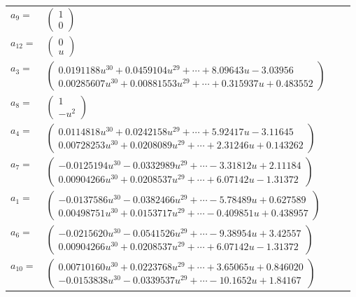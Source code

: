 \documentclass[1p]{elsarticle_modified}
\theoremstyle{definition}
\begin{document}
\begin{tabular}{m{7pt} m{180pt} m{7pt} m{180pt} }
\flushright $a_{9}=$&$\begin{pmatrix}1\\0\end{pmatrix}$ \\
\flushright $a_{12}=$&$\begin{pmatrix}0\\u\end{pmatrix}$ \\
\flushright $a_{3}=$&$\begin{pmatrix}0.0191188 u^{30}+0.0459104 u^{29}+\cdots+8.09643 u-3.03956\\0.00285607 u^{30}+0.00881553 u^{29}+\cdots+0.315937 u+0.483552\end{pmatrix}$ \\
\flushright $a_{8}=$&$\begin{pmatrix}1\\- u^2\end{pmatrix}$ \\
\flushright $a_{4}=$&$\begin{pmatrix}0.0114818 u^{30}+0.0242158 u^{29}+\cdots+5.92417 u-3.11645\\0.00728253 u^{30}+0.0208089 u^{29}+\cdots+2.31246 u+0.143262\end{pmatrix}$ \\
\flushright $a_{7}=$&$\begin{pmatrix}-0.0125194 u^{30}-0.0332989 u^{29}+\cdots-3.31812 u+2.11184\\0.00904266 u^{30}+0.0208537 u^{29}+\cdots+6.07142 u-1.31372\end{pmatrix}$ \\
\flushright $a_{1}=$&$\begin{pmatrix}-0.0137586 u^{30}-0.0382466 u^{29}+\cdots-5.78489 u+0.627589\\0.00498751 u^{30}+0.0153717 u^{29}+\cdots-0.409851 u+0.438957\end{pmatrix}$ \\
\flushright $a_{6}=$&$\begin{pmatrix}-0.0215620 u^{30}-0.0541526 u^{29}+\cdots-9.38954 u+3.42557\\0.00904266 u^{30}+0.0208537 u^{29}+\cdots+6.07142 u-1.31372\end{pmatrix}$ \\
\flushright $a_{10}=$&$\begin{pmatrix}0.00710160 u^{30}+0.0223768 u^{29}+\cdots+3.65065 u+0.846020\\-0.0153838 u^{30}-0.0339537 u^{29}+\cdots-10.1652 u+1.84167\end{pmatrix}$ \\

\end{tabular}
\end{document}
